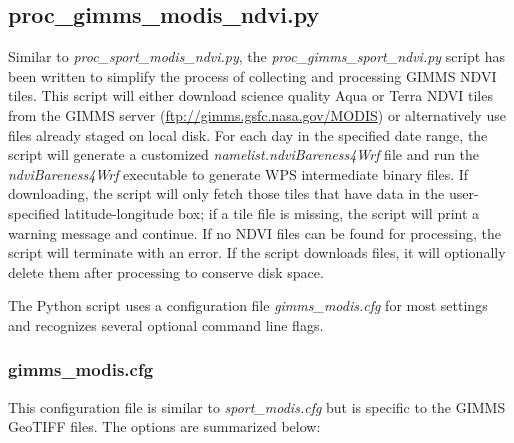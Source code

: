 \documentclass{article}
\begin{document}
\subsection{proc\_gimms\_modis\_ndvi.py}
\label{subsec:procGimmsModisNdviPy}

Similar to \textit{proc\_sport\_modis\_ndvi.py}, the
\textit{proc\_gimms\_sport\_ndvi.py} script has been written to simplify
the process of collecting and processing GIMMS NDVI tiles. This
script will either download science quality Aqua or Terra NDVI tiles from the 
GIMMS server (\url{ftp://gimms.gsfc.nasa.gov/MODIS}) or alternatively use 
files already staged on local disk.  For each day in the specified date range,
the script will generate a customized \textit{namelist.ndviBareness4Wrf} file 
and run the \textit{ndviBareness4Wrf} executable to generate WPS intermediate 
binary files.  If downloading, the script will only fetch those tiles that 
have data in the user-specified latitude-longitude box; if a tile file is 
missing, the script will print a warning message and continue.  If no NDVI 
files can be found for processing, the script will terminate with an error. If
the script downloads files, it will optionally delete them after processing to
conserve disk space.

The Python script uses a configuration file \textit{gimms\_modis.cfg} for most 
settings and recognizes several optional command line flags.

\subsubsection{gimms\_modis.cfg}
\label{gimmsModisCfg}

This configuration file is similar to \textit{sport\_modis.cfg} but is
specific to the GIMMS GeoTIFF files.  The options are summarized below:
\end{document}

